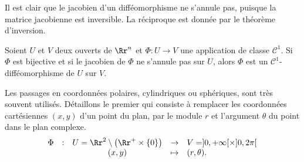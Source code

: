 \documentclass[class=report,crop=false]{standalone}
\begin{document}
\noindent Il est clair que le jacobien d'un difféomorphisme ne s'annule pas, puisque la matrice jacobienne est inversible. La réciproque est donnée par le théorème d'inversion.

\vskip6mm

\begin{theoreme}[d'inversion]Soient $U$ et $V$ deux ouverts de $\Rr^n$ et $\Phi:U\to V$ une application de classe ${\mathscr C}^1$. Si $\Phi$ est bijective et si le jacobien de $\Phi$ ne s'annule pas sur $U$, alors $\Phi$ est un ${\mathscr C}^1$-difféomorphisme de $U$ sur $V$.
\end{theoreme}

\vskip4mm

Les passages en coordonnées polaires, cylindriques ou sphériques, sont très souvent utilisés. Détaillons le premier qui consiste à remplacer les coordonnées cartésiennes $(x,y)$ d'un point du plan, par le module $r$ et l'argument $\theta$ du point dans le plan complexe.
$$\begin{array}{ccccl}\Phi &:&U=\Rr^2\setminus \left(\Rr^+\times\{0\}\right)&\to&V=]0,+\infty [\times ]0,2\pi [\\&&(x,y)&\mapsto &\displaystyle (r,\theta).\end{array}$$

\vskip4mm
\end{document}
